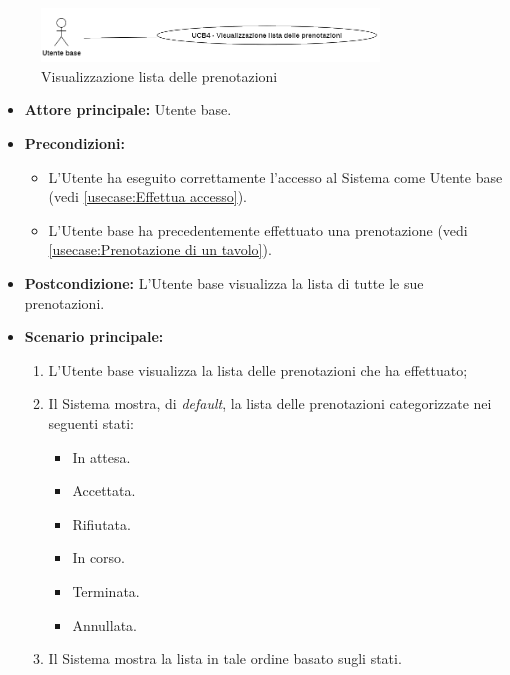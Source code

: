 \label{usecase:Visualizzazione lista delle prenotazioni}

\begin{figure}[h]
	\centering
	\includegraphics[width=0.8\textwidth]{./uml/UCB4.png} 
	\caption{Visualizzazione lista delle prenotazioni}
	\label{fig:UCB4}
  \end{figure}

\begin{itemize}
	\item \textbf{Attore principale:} Utente base.

	\item \textbf{Precondizioni:}
	      \begin{itemize}
		      \item L'Utente ha eseguito correttamente l'accesso al Sistema come Utente base (vedi \autoref{usecase:Effettua accesso}).
		      \item L'Utente base ha precedentemente effettuato una prenotazione (vedi \autoref{usecase:Prenotazione di un tavolo}).
	      \end{itemize}


	\item \textbf{Postcondizione:}
	      L'Utente base visualizza la lista di tutte le sue prenotazioni.

	\item \textbf{Scenario principale:}
	      \begin{enumerate}
		      \item L'Utente base visualizza la lista delle prenotazioni che ha effettuato;
		      \item Il Sistema mostra, di \textit{default}, la lista delle prenotazioni categorizzate nei seguenti stati:
		            \begin{itemize}
			            \item In attesa.
			            \item Accettata.
			            \item Rifiutata.
			            \item In corso.
			            \item Terminata.
			            \item Annullata.
		            \end{itemize}
		      \item Il Sistema mostra la lista in tale ordine basato sugli stati.
	      \end{enumerate}
\end{itemize}